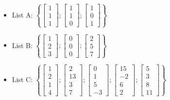 \begin{itemize}


\item 
List A:
$\left\{ \left[ \begin{array}{c} 1 \\ 1 \\ 1 \end{array} \right]; 
\left[ \begin{array}{c} 1 \\ 1 \\ 0 \end{array} \right]; 
\left[ \begin{array}{c} 1 \\ 0 \\ 1 \end{array} \right] \right\}
$


\item 
List B:
$\left\{\left[ \begin{array}{c} 1 \\ 2 \\ 3 \end{array} \right] ; 
\left[ \begin{array}{c} 0 \\ 0 \\ 0 \end{array} \right] ; 
\left[ \begin{array}{c} 2 \\ 5 \\ 7 \end{array} \right] \right\} $



\item 
List C:
$\left\{\left[ \begin{array}{c} 1 \\ 2 \\ 1 \\ 4\end{array} \right] ; 
\left[ \begin{array}{c} 2 \\ 13 \\ 3 \\ 7\end{array} \right] ; 
\left[ \begin{array}{c} 0 \\ 1 \\ 5 \\ -3\end{array} \right] ;
\left[ \begin{array}{c} 15 \\ -2 \\ 6 \\ 2\end{array} \right] ;
\left[ \begin{array}{c} 5 \\ 3 \\ 8 \\ 11\end{array} \right] \right\} $




\end{itemize}
